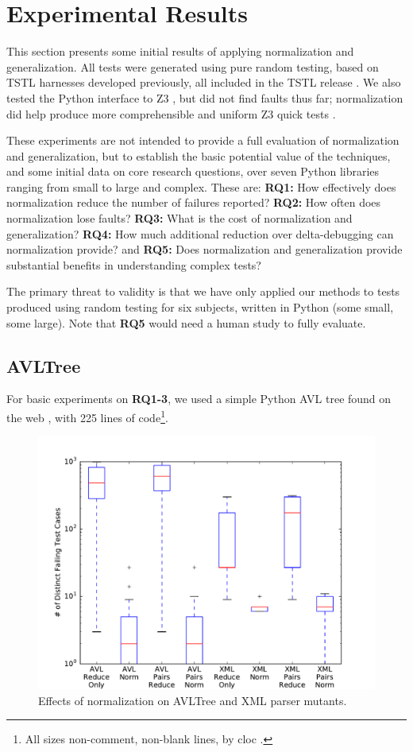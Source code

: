 \section {Experimental Results}

This section presents some initial results of applying normalization
and generalization.  All tests were generated using pure random testing,
based on TSTL harnesses developed previously, all included in the
TSTL release \cite{tstl}.  We also tested the
Python interface to Z3 \cite{z3}, but did not find faults thus far;
normalization did help produce more comprehensible and uniform Z3
quick tests \cite{icst2014}.

These experiments are not intended to provide a full evaluation of
normalization and generalization, but to establish the basic potential
value of
the techniques, and some initial data on core research questions, over
seven Python libraries ranging from small to large and complex.
These are:
{\bf RQ1:} How effectively does normalization reduce the number of
failures reported? {\bf RQ2:} How often does normalization lose
faults? {\bf RQ3:} What is the cost of normalization and generalization? {\bf RQ4:} How
much additional reduction over delta-debugging can normalization
provide? and {\bf RQ5:} Does normalization and generalization provide
substantial benefits in understanding complex tests?

The primary
threat to validity is that we have only applied our methods  to tests produced using random testing for 
six subjects, written in Python (some small, some large).  Note that {\bf RQ5} would need a human study to fully evaluate.

\subsection{AVLTree}

For basic experiments on {\bf RQ1-3}, we used a
simple Python AVL tree found on the web
\cite{avltree}, with 225 lines of code\footnote{All sizes non-comment, non-blank lines, by cloc \cite{cloc}.}.

\begin{figure}
\includegraphics[width=\columnwidth]{length}
\caption{Effects of normalization on AVLTree and XML parser mutants.}
\label{normeffect}
\end{figure}

